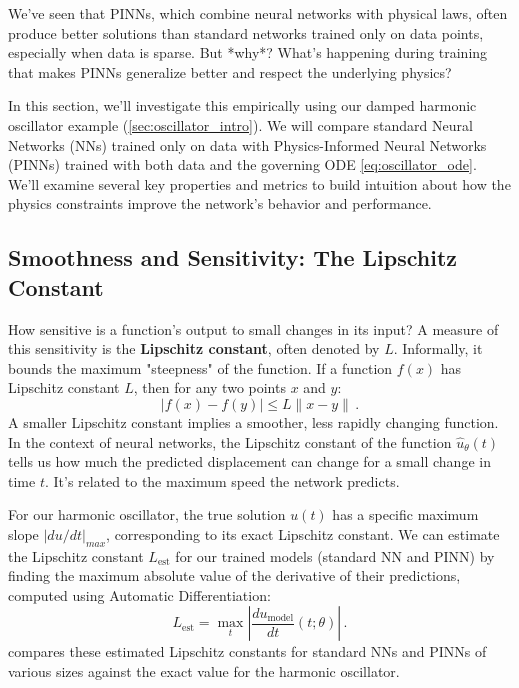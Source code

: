 We've seen that PINNs, which combine neural networks with physical laws, often produce better solutions than standard networks trained only on data points, especially when data is sparse. But *why*? What's happening during training that makes PINNs generalize better and respect the underlying physics?

In this section, we'll investigate this empirically using our damped harmonic oscillator example (\cref{sec:oscillator_intro}). We will compare standard Neural Networks (NNs) trained only on data with Physics-Informed Neural Networks (PINNs) trained with both data and the governing ODE \eqref{eq:oscillator_ode}. We'll examine several key properties and metrics to build intuition about how the physics constraints improve the network's behavior and performance.


\subsection{Smoothness and Sensitivity: The Lipschitz Constant}
\label{subsec:lipschitz_constant}

How sensitive is a function's output to small changes in its input? A measure of this sensitivity is the \textbf{Lipschitz constant}, often denoted by $L$. Informally, it bounds the maximum "steepness" of the function. If a function $f(x)$ has Lipschitz constant $L$, then for any two points $x$ and $y$:
%
\[
|f(x) - f(y)| \leq L \|x - y\|\,.
\]
%
A smaller Lipschitz constant implies a smoother, less rapidly changing function. In the context of neural networks, the Lipschitz constant of the function $\hat{u}_\theta(t)$ tells us how much the predicted displacement can change for a small change in time $t$. It's related to the maximum speed the network predicts.

For our harmonic oscillator, the true solution $u(t)$ has a specific maximum slope $|du/dt|_{max}$, corresponding to its exact Lipschitz constant. We can estimate the Lipschitz constant $L_{\text{est}}$ for our trained models (standard NN and PINN) by finding the maximum absolute value of the derivative of their predictions, computed using Automatic Differentiation:
%
\[
L_{\text{est}} = \max_{t} \left| \frac{du_{\text{model}}}{dt}(t; \theta) \right|\,.
\]
%
 compares these estimated Lipschitz constants for standard NNs and PINNs of various sizes against the exact value for the harmonic oscillator.

